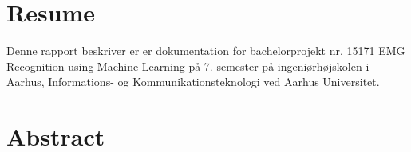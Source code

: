 \thispagestyle{fancy}
\section*{Resume}
\label{sec:resume}
Denne rapport beskriver er er dokumentation for bachelorprojekt nr. 15171 EMG Recognition using Machine Learning på 7. semester på ingeniørhøjskolen i Aarhus, Informations- og Kommunikationsteknologi ved Aarhus Universitet.

\section*{Abstract}
\label{sec:abstract}